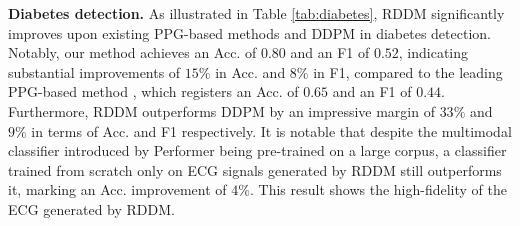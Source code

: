 \documentclass[letterpaper]{article} %
\begin{document}
    \begin{table}[t]
    \centering
    \small
    \setlength{\tabcolsep}{3pt}
    \caption{Evaluation of \textbf{Stress and Affect detection} on WESAD dataset. RDDM not only outperforms prior works, also achieves a very close performance to the upper bound.}
    \label{table:wesad}
    \end{table}

\noindent\textbf{Diabetes detection.} As illustrated in Table \ref{tab:diabetes}, RDDM significantly improves upon existing PPG-based methods and DDPM in diabetes detection. Notably, our method achieves an Acc. of $0.80$ and an F1 of $0.52$, indicating substantial improvements of $15\%$ in Acc. and $8\%$ in F1, compared to the leading PPG-based method \cite{avram2020digital}, which registers an Acc. of $0.65$ and an F1 of $0.44$. Furthermore, RDDM outperforms DDPM by an impressive margin of $33\%$ and $9\%$ in terms of Acc. and F1 respectively. It is notable that despite the multimodal classifier introduced by Performer \cite{lan2023performer} being pre-trained on a large corpus, a classifier trained from scratch only on ECG signals generated by RDDM still outperforms it, marking an Acc. improvement of $4\%$. This result shows the high-fidelity of the ECG generated by RDDM.
\end{document}
